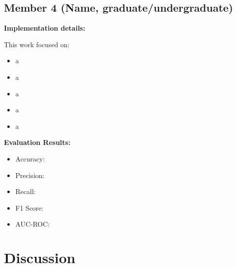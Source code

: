 \documentclass[11pt,a4paper]{article}
\begin{document}
\subsection{Member 4 (Name, graduate/undergraduate)}

\begin{tcolorbox}[
        title=Visualization and Model Evaluation,
        colback=mediumblue!30,
        colframe=darkblue,
        boxrule=0.5pt,
        fonttitle=\bfseries\sffamily\footnotesize,
        fontupper=\footnotesize
    ]
    \textbf{Implementation details:}

    This work focused on:
    \begin{itemize}[leftmargin=*, itemsep=2pt, parsep=0pt]
        \item a
        \item a
        \item a
        \item a
        \item a
    \end{itemize}

    \textbf{Evaluation Results:}
    \begin{itemize}[leftmargin=*, itemsep=2pt, parsep=0pt]
        \item Accuracy:
        \item Precision:
        \item Recall:
        \item F1 Score:
        \item AUC-ROC:
    \end{itemize}
\end{tcolorbox}

\section{Discussion}
\end{document}

